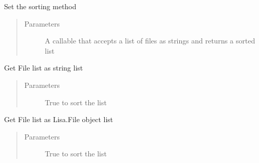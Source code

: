 \documentclass[letterpaper,10pt,openany,oneside,english]{sphinxmanual}
\begin{document}
\begin{fulllineitems}
\begin{fulllineitems}
\label{\detokenize{file:file.MultiFile.set_sorter}}
Set the sorting method
\begin{quote}\begin{description}
\item[{Parameters}] \leavevmode
{} \textendash{} A callable that accepts a list of files as strings and returns a sorted list

\end{description}\end{quote}

\end{fulllineitems}


\begin{fulllineitems}
\label{\detokenize{file:file.MultiFile.strlst}}
Get File list as string list
\begin{quote}\begin{description}
\item[{Parameters}] \leavevmode
{} \textendash{} True to sort the list

\end{description}\end{quote}

\end{fulllineitems}


\begin{fulllineitems}
\label{\detokenize{file:file.MultiFile.objlst}}
Get File list as Lisa.File object list
\begin{quote}\begin{description}
\item[{Parameters}] \leavevmode
{} \textendash{} True to sort the list

\end{description}\end{quote}

\end{fulllineitems}


\end{fulllineitems}
\end{document}
